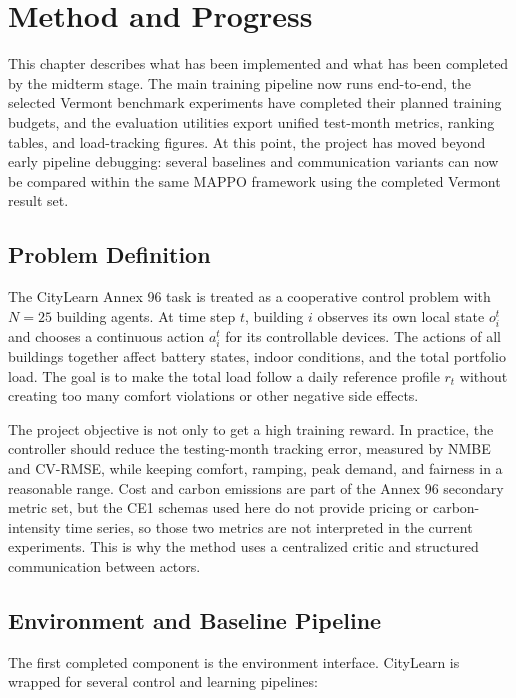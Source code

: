 ﻿\chapter{Method and Progress}\label{ch:method}

This chapter describes what has been implemented and what has been completed by
the midterm stage. The main training pipeline now runs end-to-end, the selected
Vermont benchmark experiments have completed their planned training budgets, and
the evaluation utilities export unified test-month metrics, ranking tables, and
load-tracking figures. At this point, the project has moved beyond early
pipeline debugging: several baselines and communication variants can now be
compared within the same MAPPO framework using the completed Vermont result set.

\section{Problem Definition}

The CityLearn Annex 96 task is treated as a cooperative control problem with
$N=25$ building agents. At time step $t$, building $i$ observes its own local
state $o_i^t$ and chooses a continuous action $a_i^t$ for its controllable
devices. The actions of all buildings together affect battery states, indoor
conditions, and the total portfolio load. The goal is to make the total load
follow a daily reference profile $r_t$ without creating too many comfort
violations or other negative side effects.

The project objective is not only to get a high training reward. In practice,
the controller should reduce the testing-month tracking error, measured by NMBE
and CV-RMSE, while keeping comfort, ramping, peak demand, and fairness in a
reasonable range. Cost and carbon emissions are part of the Annex 96 secondary
metric set, but the CE1 schemas used here do not provide pricing or
carbon-intensity time series, so those two metrics are not interpreted in the
current experiments. This is why the method uses a centralized critic and
structured communication between actors.

\section{Environment and Baseline Pipeline}

The first completed component is the environment interface. CityLearn is wrapped
for several control and learning pipelines:

